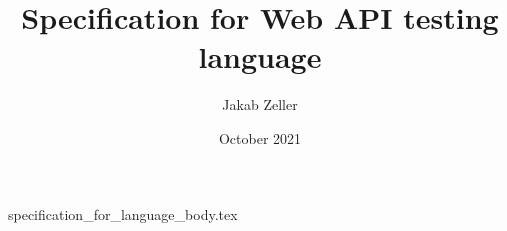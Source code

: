 \documentclass[12pt, letterpaper]{article}
\title{Specification for Web API testing language}
\author{Jakab Zeller}
\date{October 2021}
\begin{document}
\maketitle

\tableofcontents

{specification_for_language_body.tex}
\end{document}
